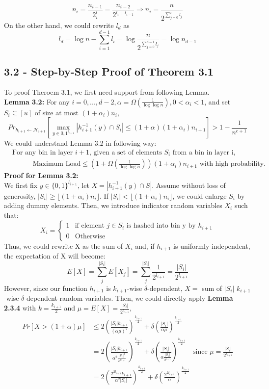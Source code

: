 \documentclass[a4paper, english]{paper}
\begin{document}
$$n_i = \frac{n_{i-1}}{2^l_i} = \frac{n_{i-2}}{2^{l_i+l_{i-1}}} \Rightarrow n_i = \frac{n}{2^{\sum_{j=0}^i l_j}}$$
On the other hand, we could rewrite $l_d$ as $$l_d = \log n - \sum_{i=1}^{d-1}l_i = \log\frac{n}{2^{\sum_{j=0}^{d-1} l_j}} =\log n_{d-1}$$

 	\subsection{3.2 - Step-by-Step Proof of Theorem 3.1}
	To proof Theroem 3.1, we first need support from following Lemma.\\
	
	\noindent\textbf{Lemma 3.2:} For any $i = {0,...,d-2},\alpha = \Omega(\frac1{\log\log n}), 0<\alpha_i<1$, and set $S_i\subseteq[u]$ of size at most $(1+\alpha_i)n_i$,
	$${Pr}_{h_{i+1}\leftarrow \mathscr{H}_{i+1}}\left[\max_{y\in{0,1}^{l_{i+1}}}|h_{i+1}^{-1}(y) \cap S_i|\le(1+\alpha)(1+\alpha_i)n_{i+1}\right]> 1-\frac1{n^{c+1}}$$
	We could understand Lemma 3.2 in following way:
	\begin{align*}
	&\text{For any bin in layer $i+1$, given a set of elements $S_i$ from a bin in layer i,}\\
	&\qquad\quad \text{Maximum Load} \le \left(1+\Omega(\frac1 {\log\log n})\right)(1+\alpha_i)n_{i+1} \text{ with high probability.}
	\end{align*}
	\noindent\textbf{Proof for Lemma 3.2:} \\
	We first fix $y\in\{0,1\}^{l_{i+1}}$, let $X=|h_{i+1}^{-1}(y)\cap S|$. Assume without loss of generosity, $|S_i|\ge \lfloor (1+\alpha_i)n_i\rfloor$. If $|S_i|< \lfloor (1+\alpha_i)n_i\rfloor$, we could enlarge $S_i$ by adding dummy elements. Then, we introduce indicator random variables $X_i$ such that:
\[ X_i=\begin{cases} 
      1 & \text{if element }j\in S_i\text{ is hashed into bin y by }h_{i+1} \\
      0 & \text{Otherwise}
   \end{cases}
\]
	Thus, we could rewrite X as the sum of $X_i$ and, if $h_{i+1}$ is uniformly independent, the expectation of X will become:
	$$E[X] = \sum_j^{|S_i|}E[X_j]=\sum_j^{|S_i|}\frac1{2^{l_{i+1}}} = \frac{|S_i|}{2^{l_{i+1}}}$$
	However, since our function $h_{i+1}$ is $k_{i+1}$-wise $\delta$-dependent, $X=$ sum of $|S_i|$ $k_{i+1}$-wise $\delta$-dependent random variables. Then, we could directly apply \textbf{Lemma 2.3.4} with $k = \frac{k_{i+1}}2$ and $\mu =E[X]=\frac{|S_i|}{2^{l_{i+1}}}$,
	\begin{align*}
	Pr[X>(1+\alpha)\mu] &\le 2\left(\frac{|S_i|k_{i+1}}{(\alpha\mu)^2}\right)^{\frac{k_{i+1}}2}+\delta\left( \frac{|S_i|}{\alpha\mu}\right)^{\frac{k_{i+1}}2}\\
	&= 2\left(\frac{|S_i|k_{i+1}}{\alpha^2 \frac{|S_i|^2}{2^{2l_{i+1}}}}\right)^{\frac{k_{i+1}}2} +\delta\left( \frac{|S_i|}{\alpha\frac{|S_i|}{2^{l_{i+1}}}}\right)^{\frac{k_{i+1}}2}\quad\text{since }\mu =\frac{|S_i|}{2^{l_{i+1}}}\\
	&= 2\left(\frac{2^{2l_{i+1}}k_{i+1}}{\alpha^2 |S_i|}\right)^{\frac{k_{i+1}}2} +\delta\left( \frac{2^{2l_{i+1}}}{\alpha}\right)^{\frac{k_{i+1}}2}
	\end{align*}
\end{document}
